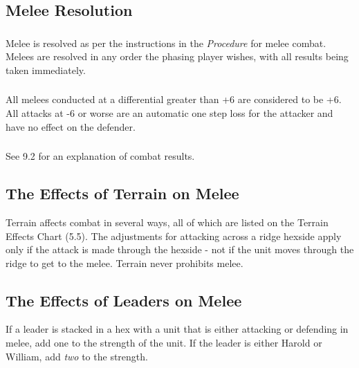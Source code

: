 \subsection{Melee Resolution}

\subsubsection[Procedure]{} Melee is resolved as per the instructions in the \textit{Procedure} for melee combat. Melees are resolved in any order the phasing player wishes, with all results being taken immediately.

\subsubsection[Differentials]{} All melees conducted at a differential greater than +6 are considered to be +6. All attacks at -6 or worse are an automatic one step loss for the attacker and have no effect on the defender.

\subsubsection[Results]{} See 9.2 for an explanation of combat results.

\subsection{The Effects of Terrain on Melee}

Terrain affects combat in several ways, all of which are listed on the Terrain Effects Chart (5.5). The adjustments for attacking across a ridge hexside apply only if the attack is made through the hexside - not if the unit moves through the ridge to get to the melee. Terrain never prohibits melee.

\subsection{The Effects of Leaders on Melee}

If a leader is stacked in a hex with a unit that is either attacking or defending in melee, add one to the strength of the unit. If the leader is either Harold or William, add \textit{two} to the strength.
